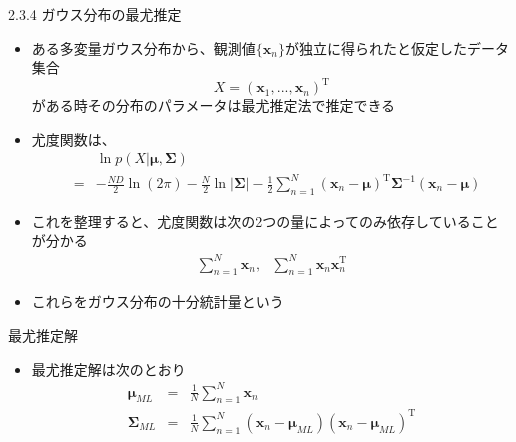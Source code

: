 \begin{frame}{2.3.4 ガウス分布の最尤推定}
 \begin{itemize}
  \item  ある多変量ガウス分布から、観測値$\{\bm{x}_n\}$が独立に得られたと仮定したデータ集合
         \begin{equation}
          X=(\bm{x}_1,...,\bm{x}_n)^{\mathrm{T}}
         \end{equation}
         がある時その分布のパラメータは最尤推定法で推定できる
  \item 尤度関数は、
        \begin{eqnarray*}
         && \ln  p(X|\bm{\mu}, \bm{\Sigma}) \\
         &=& -\frac{ND}{2}\ln (2\pi)-\frac{N}{2}\ln |\bm{\Sigma}|-\frac{1}{2}\sum_{n=1}^{N}(\bm{x}_n-\bm{\mu})^{\mathrm{T}}\bm{\Sigma}^{-1}(\bm{x}_n-\bm{\mu})
        \end{eqnarray*}
  \item これを整理すると、尤度関数は次の2つの量によってのみ依存していることが分かる
        \begin{eqnarray}
         \sum_{n=1}^{N}\bm{x}_n, \ \ \  \sum_{n=1}^{N}\bm{x}_n\bm{x}_n^{\mathrm{T}}
        \end{eqnarray}
  \item これらをガウス分布の\alert{十分統計量}という
 \end{itemize}
\end{frame}

\begin{frame}{最尤推定解}
 \begin{itemize}
  \item 最尤推定解は次のとおり
        \begin{eqnarray}
         \bm{\mu}_{ML} &=& \frac{1}{N}\sum_{n=1}^{N}\bm{x}_n\\
         \bm{\Sigma}_{ML}&=&\frac{1}{N}\sum_{n=1}^{N}(\bm{x}_n-\bm{\mu}_{ML})(\bm{x}_n-\bm{\mu}_{ML})^{\mathrm{T}}
        \end{eqnarray}
 \end{itemize}
\end{frame}

